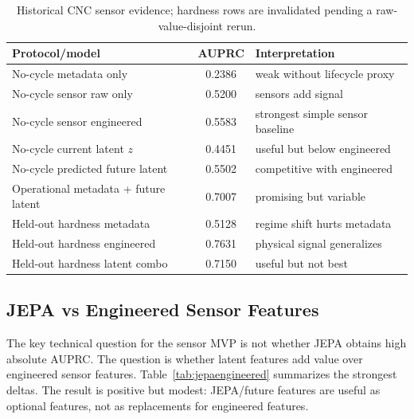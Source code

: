 \documentclass[10pt,conference]{IEEEtran}
\begin{document}
\begin{table}[t]
\centering
\caption{Historical CNC sensor evidence; hardness rows are invalidated pending a raw-value-disjoint rerun.}
\label{tab:sensor}
\footnotesize
\setlength{\tabcolsep}{3pt}
\renewcommand{\arraystretch}{1.12}
\begin{tabularx}{\columnwidth}{@{}Y c Y@{}}
\toprule
Protocol/model & AUPRC & Interpretation \\
\midrule
No-cycle metadata only & 0.2386 & weak without lifecycle proxy \\
No-cycle sensor raw only & 0.5200 & sensors add signal \\
No-cycle sensor engineered & 0.5583 & strongest simple sensor baseline \\
No-cycle current latent $z$ & 0.4451 & useful but below engineered \\
No-cycle predicted future latent & 0.5502 & competitive with engineered \\
Operational metadata + future latent & 0.7007 & promising but variable \\
Held-out hardness metadata & 0.5128 & regime shift hurts metadata \\
Held-out hardness engineered & 0.7631 & physical signal generalizes \\
Held-out hardness latent combo & 0.7150 & useful but not best \\
\bottomrule
\end{tabularx}
\end{table}

\subsection{JEPA vs Engineered Sensor Features}
The key technical question for the sensor MVP is not whether JEPA obtains high absolute AUPRC. The question is whether latent features add value over engineered sensor features. Table~\ref{tab:jepaengineered} summarizes the strongest deltas. The result is positive but modest: JEPA/future features are useful as optional features, not as replacements for engineered features.
\end{document}
